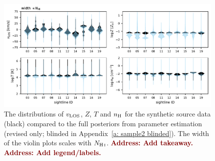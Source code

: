 \documentclass[fleqn,usenatbib]{mnras}
\newcommand{\todo}[1]{\textcolor{Maroon}{\textbf{Address: #1}}}
\begin{document}
\begin{figure}
    \centering
    \includegraphics[width=\textwidth]{figures/sample2/violin_revised.pdf}
    \caption{
    The distributions of $v_{\rm LOS}$, $Z$, $T$ and $n_{\rm H}$ for the synthetic source data (black) compared to the full posteriors from parameter estimation (revised only; blinded in Appendix~\ref{a: sample2 blinded}).
    The width of the violin plots scales with $N_{\ion{H}{I}}$.
    \todo{Add takeaway.}
    \todo{Add legend/labels.}
    }
    \label{f: sample2 violin}
\end{figure}
\end{document}
